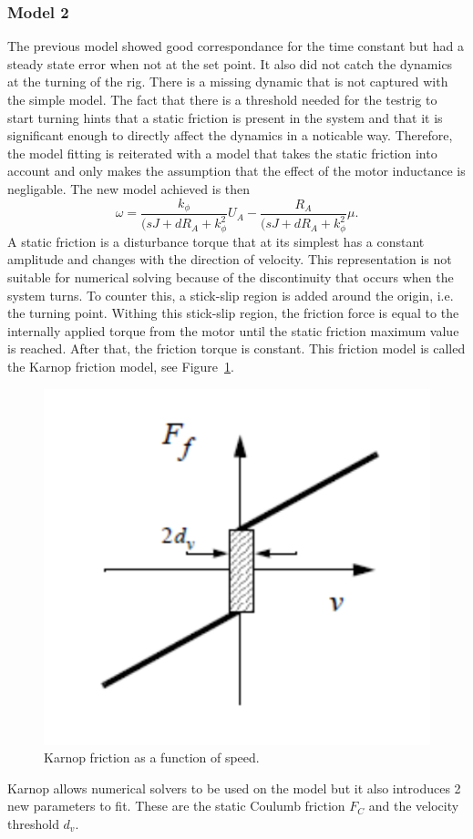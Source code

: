 \subsubsection{Model 2}
The previous model showed good correspondance for the time constant but had a
steady state error when not at the set point. It also did not catch the dynamics
at the turning of the rig. There is a missing dynamic that is not captured with
the simple model. The fact that there is a threshold needed for the testrig to
start turning hints that a static friction is present in the system and that it
is significant enough to directly affect the dynamics in a noticable way.
Therefore, the model fitting is reiterated with a model that takes the static
friction into account and only makes the assumption that the effect of the motor
inductance is negligable. The new model achieved is then
\begin{equation} \label{eq:model2}
    \omega = \frac {k_{\phi}} {(sJ + d R_A + k_{\phi}^2} U_A -
    \frac {R_A} {(sJ + d R_A + k_{\phi}^2} \mu.
\end{equation}
A static friction is a disturbance torque that at its simplest has a constant
amplitude and changes with the direction of velocity. This representation is not
suitable for numerical solving because of the discontinuity that occurs when the
system turns. To counter this, a stick-slip region is added around the origin,
i.e. the turning point. Withing this stick-slip region, the friction force is
equal to the internally applied torque from the motor until the static friction
maximum value is reached. After that, the friction torque is constant. This
friction model is called the Karnop friction model, see Figure~\ref{fig:karnop}.
\begin{figure}[H]
    \label{fig:karnop}
    \centering
    \includegraphics[width=\textwidth]{./img/testrig_karnop.png}
    \caption{Karnop friction as a function of speed.}
\end{figure}
Karnop allows numerical solvers to be used on the model but it also introduces 2 new
parameters to fit. These are the static Coulumb friction $F_C$ and the velocity
threshold $d_v$.

